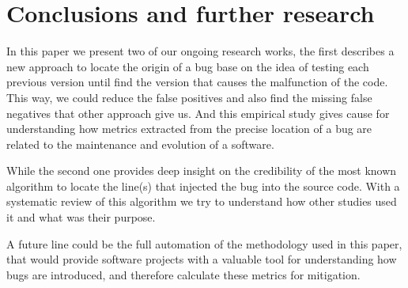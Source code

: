 \documentclass[a4paper]{article}
\begin{document}
\section{Conclusions and further research}

In this paper we present two of our ongoing research works, the first describes a new approach to locate the origin of a bug base on the idea of testing each previous version until find the version that causes the malfunction of the code. This way, we could reduce the false positives and also find the missing false negatives that other approach give us. And this empirical study gives cause for understanding how metrics extracted from the precise location of a bug are related to the maintenance and evolution of a software.

While the second one provides deep insight on the credibility of the most known algorithm to locate the line(s) that injected the bug into the source code. With a systematic review of this algorithm we try to understand how other studies used it and what was their purpose.

A future line could be the full automation of the methodology used in this paper, that would provide software projects with a valuable tool for understanding how bugs are introduced, and therefore calculate these metrics for mitigation.
\end{document}
